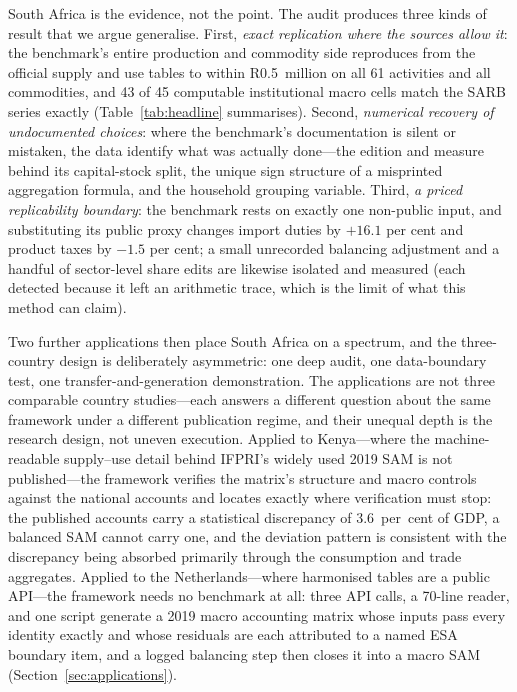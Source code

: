 South Africa is the evidence, not the point. The audit produces three kinds
of result that we argue generalise. First, \emph{exact replication where
the sources allow it}: the benchmark's entire production and commodity
side reproduces from the official supply and use tables to within
R0.5~million on all 61 activities and all commodities, and 43 of 45
computable institutional macro cells match the SARB series exactly
(Table~\ref{tab:headline} summarises). Second, \emph{numerical recovery of
undocumented choices}: where the benchmark's documentation is silent or
mistaken, the data identify what was actually done---the edition and
measure behind its capital-stock split, the unique sign structure of a
misprinted aggregation formula, and the household grouping variable.
Third, \emph{a priced replicability boundary}: the benchmark rests on
exactly one non-public input, and substituting its public proxy changes
import duties by $+16.1$ per cent and product taxes by $-1.5$ per cent; a
small unrecorded balancing adjustment and a handful of sector-level share
edits are likewise isolated and measured (each detected because it left
an arithmetic trace, which is the limit of what this method can claim).

Two further applications then place South Africa on a spectrum, and the
three-country design is deliberately asymmetric: one deep audit, one
data-boundary test, one transfer-and-generation demonstration. The
applications are not three comparable country studies---each answers a
different question about the same framework under a different publication
regime, and their unequal depth is the research design, not uneven
execution. Applied to Kenya---where the machine-readable supply--use
detail behind IFPRI's widely used 2019 SAM is not published---the
framework verifies the matrix's structure and macro controls against the
national accounts and locates exactly where verification must stop: the
published accounts carry a statistical discrepancy of 3.6~per~cent of
GDP, a balanced SAM cannot carry one, and the deviation pattern is
consistent with the discrepancy being absorbed primarily through the
consumption and trade aggregates. Applied to the Netherlands---where
harmonised tables are a public API---the framework needs no benchmark at
all: three API calls, a 70-line reader, and one script generate a 2019
macro accounting matrix whose inputs pass every identity exactly and
whose residuals are each attributed to a named ESA boundary item, and a
logged balancing step then closes it into a macro SAM
(Section~\ref{sec:applications}).

